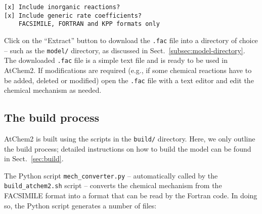 \begin{verbatim}
[x] Include inorganic reactions?
[x] Include generic rate coefficients?
    FACSIMILE, FORTRAN and KPP formats only
\end{verbatim}

Click on the ``Extract'' button to download the \texttt{.fac} file
into a directory of choice -- such as the \texttt{model/} directory,
as discussed in Sect.~\ref{subsec:model-directory}. The downloaded
\texttt{.fac} file is a simple text file and is ready to be used in
AtChem2. If modifications are required (e.g., if some chemical
reactions have to be added, deleted or modified) open the
\texttt{.fac} file with a text editor and edit the chemical mechanism
as needed.

\subsection{The build process} \label{subsec:build-process}

AtChem2 is built using the scripts in the \texttt{build/}
directory. Here, we only outline the build process; detailed
instructions on how to build the model can be found in
Sect.~\ref{sec:build}.

The Python script \texttt{mech\_converter.py} -- automatically called
by the \texttt{build\_atchem2.sh} script -- converts the chemical
mechanism from the FACSIMILE format into a format that can be read by
the Fortran code. In doing so, the Python script generates a number of
files:

